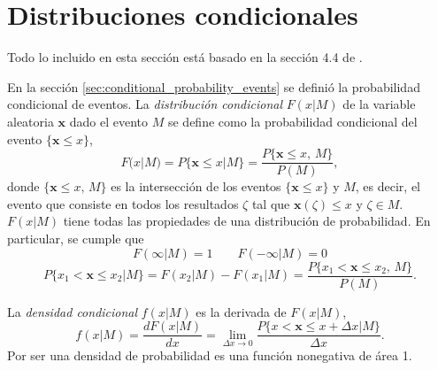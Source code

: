 \documentclass[a4paper]{report}
\newcommand{\x}{\mathbf{x}}
\begin{document}
\section{Distribuciones condicionales}\label{sec:conditional_distributions}

Todo lo incluido en esta sección está basado en la sección 4.4 de \cite{papoulis2002probability}.

En la sección \ref{sec:conditional_probability_events} se definió la probabilidad condicional de eventos. La \emph{distribución condicional} \(F(x|M)\) de la variable aleatoria \(\x\) dado el evento \(M\) se define como la probabilidad condicional del evento \(\{\x\leq x\}\),
\begin{equation}\label{eq:conditional_distribution_definition}
 F(x|M)=P\{\x\leq x|M\}=\frac{P\{\x\leq x,\,M\}}{P(M)},
\end{equation}
donde \(\{\x\leq x,\,M\}\) es la intersección de los eventos \(\{\x\leq x\}\) y \(M\), es decir, el evento que consiste en todos los resultados \(\zeta\) tal que \(\x(\zeta)\leq x\) y \(\zeta\in M\). \(F(x|M)\) tiene todas las propiedades de una distribución de probabilidad. En particular, se cumple que
\[
 F(\infty|M)=1\qquad F(-\infty|M)=0
\]
\[
 P\{x_1<\x\leq x_2|M\}=F(x_2|M)-F(x_1|M)=\frac{P\{x_1<\x\leq x_2,\,M\}}{P(M)}.
\]

La \emph{densidad condicional} \(f(x|M)\) es la derivada de \(F(x|M)\),
\[
 f(x|M)=\frac{dF(x|M)}{dx}=\lim_{\Delta x\to 0}\frac{P\{x<\x\leq x+\Delta x|M\}}{\Delta x}.
\]
Por ser una densidad de probabilidad es una función nonegativa de área 1.
\end{document}
